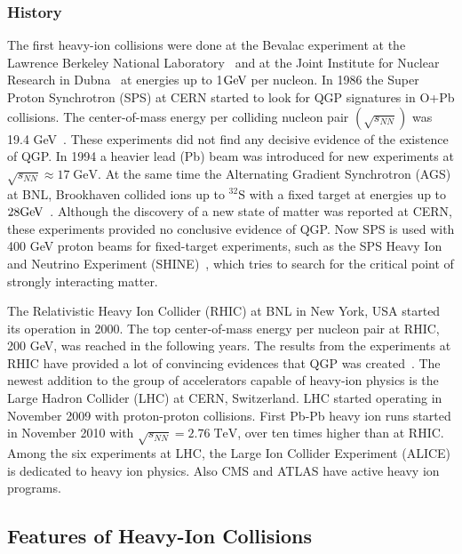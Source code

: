 \subsubsection{History}
The first heavy-ion collisions were done at the Bevalac experiment at the Lawrence Berkeley National Laboratory~\cite{Lofgren_1975} and at the Joint Institute for Nuclear Research in Dubna~\cite{kovalenko1994status} at energies up to 1$\mathrm{GeV}\kern-0.05em$ per nucleon.
In 1986 the Super Proton Synchrotron (SPS) at CERN started to look for QGP signatures in O+Pb collisions. The center-of-mass energy per colliding nucleon pair $\left(\sqrt{s_{NN}}\right)$ was 19.4 GeV~\cite{Vitev:2002pf}. These experiments did not find any decisive evidence of the existence of QGP. In 1994 a heavier lead (Pb) beam was introduced for new experiments at $\sqrt{s_{NN}}\approx 17\; \mathrm{GeV}$. At the same time the Alternating Gradient Synchrotron (AGS) at BNL, Brookhaven collided ions up to $\mathrm{^{32}S}$ with a fixed target at energies up to $28\mathrm{GeV}\kern-0.05em$~\cite{Barton:1987}. Although the discovery of a new state of matter was reported at CERN, these experiments provided no conclusive evidence of QGP. Now SPS is used with 400 GeV proton beams for fixed-target experiments, such as the SPS Heavy Ion and Neutrino Experiment (SHINE)~\cite{Grebieszkow:2013nza}, which tries to search for the critical point of strongly interacting matter.

The Relativistic Heavy Ion Collider (RHIC) at BNL in New York, USA started its  operation in 2000. The top center-of-mass energy per nucleon pair at RHIC, 200 GeV, was reached in the following years. The results from the experiments at RHIC have provided a lot of convincing evidences that QGP was created~\cite{Adcox:2004mh, Adams:2005dq, Arsene:2004fa, Back:2004je}. The newest addition to the group of accelerators capable of heavy-ion physics is the Large Hadron Collider (LHC) at CERN, Switzerland. LHC started operating in November 2009 with proton-proton collisions. First Pb-Pb heavy ion runs started in November 2010 with $\sqrt{s_{NN}}=2.76\; \mathrm{TeV}$,  over ten times higher than at RHIC. Among the six experiments at LHC, the Large Ion Collider Experiment (ALICE) is dedicated to heavy ion physics. Also CMS and ATLAS have active heavy ion programs. 

\pagebreak
\FloatBarrier
\subsection{Features of Heavy-Ion Collisions}
\label{sec:features}
